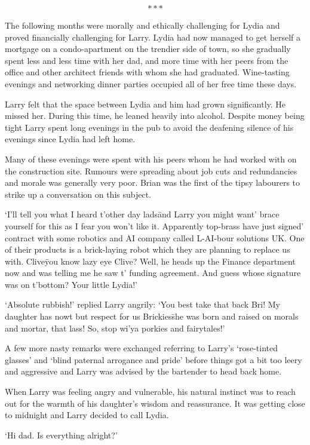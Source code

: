 \[***\]

The following months were morally and ethically challenging for Lydia
and proved financially challenging for Larry. Lydia had now managed to
get herself a mortgage on a condo-apartment on the trendier side of
town, so she gradually spent less and less time with her dad, and more
time with her peers from the office and other architect friends with
whom she had graduated. Wine-tasting evenings and networking dinner
parties occupied all of her free time these days.

Larry felt that the space between Lydia and him had grown
significantly. He missed her. During this time, he leaned heavily into
alcohol. Despite money being tight Larry spent long evenings in the
pub to avoid the deafening silence of his evenings since Lydia had
left home.

Many of these evenings were spent with his peers whom he had worked
with on the construction site. Rumours were spreading about job cuts
and redundancies and morale was generally very poor. Brian was the
first of the tipsy labourers to strike up a conversation on this
subject.

`I'll tell you what I heard t'other day lads\=and Larry you might
want' brace yourself for this as I fear you won't like it. Apparently
top-brass have just signed' contract with some robotics and AI company
called L-AI-bour solutions UK. One of their products is a brick-laying
robot which they are planning to replace us with. Clive\=you know lazy
eye Clive? Well, he heads up the Finance department now and was
telling me he saw t' funding agreement. And guess whose signature was
on t'bottom? Your little Lydia!'

`Absolute rubbish!' replied Larry angrily: `You best take that back
Bri! My daughter has nowt but respect for us Brickies\=she was born
and raised on morals and mortar, that lass! So, stop wi'ya porkies and
fairytales!'

A few more nasty remarks were exchanged referring to Larry's
`rose-tinted glasses' and `blind paternal arrogance and pride' before
things got a bit too leery and aggressive and Larry was advised by the
bartender to head back home.

When Larry was feeling angry and vulnerable, his natural instinct was
to reach out for the warmth of his daughter's wisdom and
reassurance. It was getting close to midnight and Larry decided to
call Lydia.

`Hi dad. Is everything alright?'

